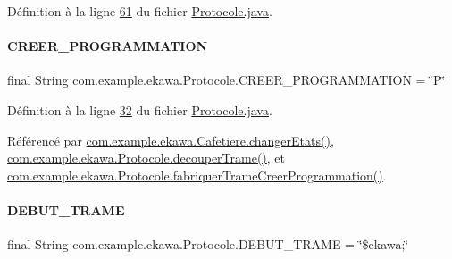 Définition à la ligne \hyperlink{_protocole_8java_source_l00061}{61} du fichier \hyperlink{_protocole_8java_source}{Protocole.\+java}.

\mbox{\label{classcom_1_1example_1_1ekawa_1_1_protocole_a2ca55536aa2d416dbc4bf7856c6bae3c}} 
\paragraph{\texorpdfstring{C\+R\+E\+E\+R\+\_\+\+P\+R\+O\+G\+R\+A\+M\+M\+A\+T\+I\+ON}{CREER\_PROGRAMMATION}}
{\footnotesize\ttfamily final String com.\+example.\+ekawa.\+Protocole.\+C\+R\+E\+E\+R\+\_\+\+P\+R\+O\+G\+R\+A\+M\+M\+A\+T\+I\+ON = \char`\"{}P\char`\"{}\hspace{0.3cm}{\ttfamily [static]}}



Définition à la ligne \hyperlink{_protocole_8java_source_l00032}{32} du fichier \hyperlink{_protocole_8java_source}{Protocole.\+java}.



Référencé par \hyperlink{_cafetiere_8java_source_l00463}{com.\+example.\+ekawa.\+Cafetiere.\+changer\+Etats()}, \hyperlink{_protocole_8java_source_l00208}{com.\+example.\+ekawa.\+Protocole.\+decouper\+Trame()}, et \hyperlink{_protocole_8java_source_l00175}{com.\+example.\+ekawa.\+Protocole.\+fabriquer\+Trame\+Creer\+Programmation()}.

\mbox{\label{classcom_1_1example_1_1ekawa_1_1_protocole_a9a73b15a5d0408ae423cc6f4ff3e7c21}} 
\paragraph{\texorpdfstring{D\+E\+B\+U\+T\+\_\+\+T\+R\+A\+ME}{DEBUT\_TRAME}}
{\footnotesize\ttfamily final String com.\+example.\+ekawa.\+Protocole.\+D\+E\+B\+U\+T\+\_\+\+T\+R\+A\+ME = \char`\"{}\$ekawa;\char`\"{}\hspace{0.3cm}{\ttfamily [static]}}



